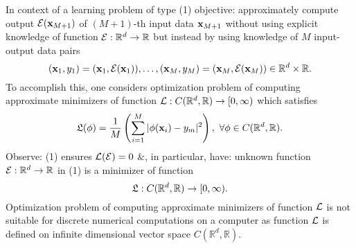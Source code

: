 \documentclass{article}
\begin{document}
\begin{enumerate}
	In context of a learning problem of type (1) objective: approximately compute output ${\cal E}({\bf x}_{M+1})$ of $(M + 1)$-th input data ${\bf x}_{M+1}$ without using explicit knowledge of function ${\cal E}:\mathbb{R}^d\to\mathbb{R}$ but instead by using knowledge of $M$ input-output data pairs
	\begin{equation}
		({\bf x}_1,y_1) = ({\bf x}_1,{\cal E}({\bf x}_1)),\ldots,({\bf x}_M,y_M) = ({\bf x}_M,{\cal E}({\bf x}_M))\in\mathbb{R}^d\times\mathbb{R}.
	\end{equation}
	To accomplish this, one considers optimization problem of computing approximate minimizers of function ${\cal L}:C(\mathbb{R}^d,\mathbb{R})\to[0,\infty)$ which satisfies
	\begin{equation}
		{\frak L}(\phi) = \frac{1}{M}\left(\sum_{i=1}^M |\phi({\bf x}_i) - y_m|^2\right),\ \forall\phi\in C(\mathbb{R}^d,\mathbb{R}).
	\end{equation}
	Observe: (1) ensures ${\cal L}({\cal E}) = 0$ \&, in particular, have: unknown function ${\cal E}:\mathbb{R}^d\to\mathbb{R}$ in (1) is a minimizer of function
	\begin{equation}
		{\frak L}:C(\mathbb{R}^d,\mathbb{R})\to[0,\infty).
	\end{equation}
	Optimization problem of computing approximate minimizers of function ${\cal L}$ is not suitable for discrete numerical computations on a computer as function ${\cal L}$ is defined on infinite dimensional vector space $C(\mathbb{R}^d,\mathbb{R})$.
	

\end{enumerate}
\end{document}
